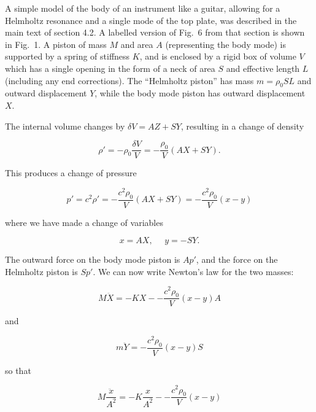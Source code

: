   A simple model of the body of an instrument like a guitar, allowing for a 
  Helmholtz resonance and a single mode of the top plate, was described in the 
  main text of section 4.2. A labelled version of Fig.\ 6 from that section is 
  shown in Fig.\ 1. A piston of mass $M$ and area $A$ (representing the body 
  mode) is supported by a spring of stiffness $K$, and is enclosed by a rigid 
  box of volume $V$ which has a single opening in the form of a neck of area 
  $S$ and effective length $L$ (including any end corrections). The ``Helmholtz 
  piston'' has mass $m=\rho_0 SL$ and outward displacement $Y$, while the body 
  mode piston has outward displacement $X$. 


  The internal volume changes by $\delta V = AZ + SY$, resulting in a change of 
  density 

  \begin{equation*}\rho' = -\rho_0 \dfrac{\delta V}{V}=-\dfrac{\rho_0}{V} 
  (AX+SY) . \tag{1}\end{equation*} 

  This produces a change of pressure 

  \begin{equation*}p' = c^2 \rho' =- \dfrac{c^2 \rho_0}{V} (AX+SY)=- \dfrac{c^2 
  \rho_0}{V} (x-y) \tag{12}\end{equation*} 

  \noindent{}where we have made a change of variables 

  \begin{equation*}x=AX,\mathrm{~~~~~~}y=-SY . \tag{3}\end{equation*} 

  The outward force on the body mode piston is $Ap'$, and the force on the 
  Helmholtz piston is $Sp'$. We can now write Newton's law for the two masses: 

  \begin{equation*}M \ddot{X}=-KX -- \dfrac{c^2 \rho_0}{V} (x-y)A 
  \tag{4}\end{equation*} 

  \noindent{}and 

  \begin{equation*}m \ddot{Y}=- \dfrac{c^2 \rho_0}{V} (x-y)S 
  \tag{5}\end{equation*} 

  \noindent{}so that 

  \begin{equation*}M \dfrac{\ddot{x}}{A^2}=-K\dfrac{x}{A^2} -- \dfrac{c^2 
  \rho_0}{V} (x-y) \tag{6}\end{equation*} 


